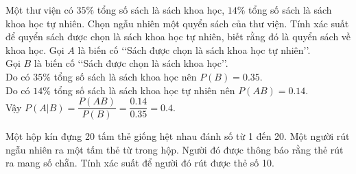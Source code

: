 \begin{bt}%
	Một thư viện có $35\%$ tổng số sách là sách khoa học, $14\%$ tổng số sách là sách khoa học tự nhiên. Chọn ngẫu nhiên một quyển sách của thư viện. Tính xác suất để quyển sách được chọn là sách khoa học tự nhiên, biết rằng đó là quyển sách về khoa học.
	\loigiai
	{Gọi $A$ là biến cố \lq\lq  Sách được chọn là sách khoa học tự nhiên\rq\rq.\\
	Gọi $B$ là biến cố \lq\lq  Sách được chọn là sách khoa học\rq\rq.\\
	Do có $35\%$ tổng số sách là sách khoa học nên $P(B)=0{.}35$.\\
	Do có $14\%$ tổng số sách là sách khoa học tự nhiên nên $P(AB)=0{.}14$.\\
	Vậy $P(A|B)=\dfrac{P(AB)}{P(B)}=\dfrac{0{.}14}{0{.}35}=0{.}4$.
	}
\end{bt}


\begin{bt}
	Một hộp kín đựng 20 tấm thẻ giống hệt nhau đánh số từ 1 đến 20. Một người rút ngẫu nhiên ra một tấm thẻ từ trong hộp. Người đó được thông báo rằng thẻ rút ra mang số chẵn. Tính xác suất để người đó rút được thẻ số 10.
\end{bt}

